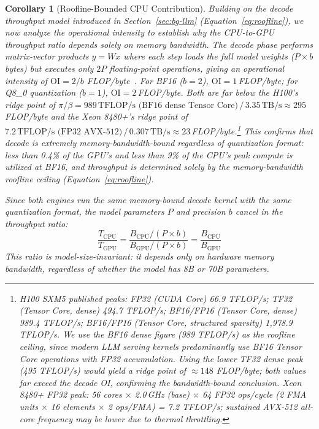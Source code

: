 \documentclass[10pt,conference]{IEEEtran}
\newtheorem{corollary}[theorem]{Corollary}
\begin{document}
\begin{corollary}[Roofline-Bounded CPU Contribution]
\label{cor:roofline}
Building on the decode throughput model introduced in Section~\ref{sec:bg-llm} (Equation~\ref{eq:roofline}), we now analyze the operational intensity to establish why the CPU-to-GPU throughput ratio depends solely on memory bandwidth.
The decode phase performs matrix-vector products $y = Wx$ where each step loads the full model weights ($P \times b$ bytes) but executes only $2P$ floating-point operations, giving an operational intensity of $\text{OI} = 2/b$ FLOP/byte~\cite{williams2009roofline}.
For BF16 ($b=2$), $\text{OI} = 1$\,FLOP/byte; for Q8\_0 quantization ($b=1$), $\text{OI} = 2$\,FLOP/byte.
Both are far below the H100's ridge point of $\pi/\beta = 989\,\text{TFLOP/s (BF16 dense Tensor Core)}\,/\,3.35\,\text{TB/s} \approx 295$\,FLOP/byte and the Xeon 8480+'s ridge point of $7.2\,\text{TFLOP/s (FP32 AVX-512)}\,/\,0.307\,\text{TB/s} \approx 23$\,FLOP/byte.\footnote{H100 SXM5 published peaks: FP32 (CUDA Core) 66.9 TFLOP/s; TF32 (Tensor Core, dense) 494.7 TFLOP/s; BF16/FP16 (Tensor Core, dense) 989.4 TFLOP/s; BF16/FP16 (Tensor Core, structured sparsity) 1{,}978.9 TFLOP/s. We use the BF16 dense figure (989 TFLOP/s) as the roofline ceiling, since modern LLM serving kernels predominantly use BF16 Tensor Core operations with FP32 accumulation. Using the lower TF32 dense peak (495 TFLOP/s) would yield a ridge point of ${\approx}148$ FLOP/byte; both values far exceed the decode OI, confirming the bandwidth-bound conclusion. Xeon 8480+ FP32 peak: 56 cores $\times$ 2.0\,GHz (base) $\times$ 64 FP32 ops/cycle (2 FMA units $\times$ 16 elements $\times$ 2 ops/FMA) = 7.2 TFLOP/s; sustained AVX-512 all-core frequency may be lower due to thermal throttling.}
This confirms that decode is \emph{extremely} memory-bandwidth-bound regardless of quantization format: less than 0.4\% of the GPU's and less than 9\% of the CPU's peak compute is utilized at BF16, and throughput is determined solely by the memory-bandwidth roofline ceiling (Equation~\ref{eq:roofline}).

Since both engines run the same memory-bound decode kernel with the same quantization format, the model parameters $P$ and precision $b$ cancel in the throughput ratio:
\begin{equation}
\label{eq:ratio}
\frac{T_\text{CPU}}{T_\text{GPU}} = \frac{B_\text{CPU} / (P \times b)}{B_\text{GPU} / (P \times b)} = \frac{B_\text{CPU}}{B_\text{GPU}}
\end{equation}
This ratio is model-size-invariant: it depends only on hardware memory bandwidth, regardless of whether the model has 8B or 70B parameters.


\end{corollary}
\end{document}
